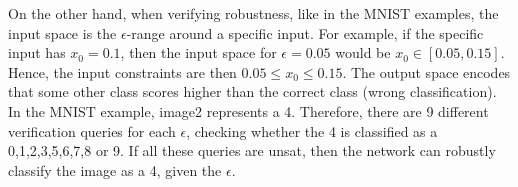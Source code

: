 \documentclass[12pt,a4paper]{article}
\begin{document}
On the other hand, when verifying robustness, like in the MNIST examples, the input space is the $\epsilon$-range 
around a specific input. For example, if the specific input has $x_0=0.1$, then the input space for $\epsilon=0.05$ 
would be $x_0 \in [0.05, 0.15]$. Hence, the input constraints are then $0.05 \leq x_0 \leq 0.15$. The output space 
encodes that some other class scores higher than the correct class (wrong classification). In the MNIST example, image2 represents a 4. 
Therefore, there are 9 different verification queries for each $\epsilon$, checking whether the 4 is classified as a 
0,1,2,3,5,6,7,8 or 9. If all these queries are unsat, then the network can robustly classify the image as a 4, given 
the $\epsilon$.
\end{document}
